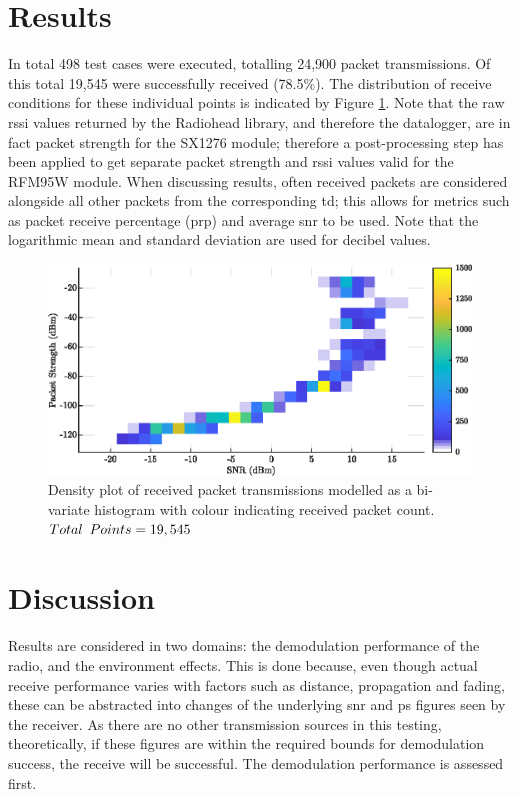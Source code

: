 \section{Results}
In total 498 test cases were executed, totalling 24,900 packet transmissions. Of this total 19,545 were successfully received (78.5\%). The distribution of receive conditions for these individual points is indicated by Figure \ref{fig:density_plot}. Note that the raw \ac{rssi} values returned by the Radiohead library, and therefore the datalogger, are in fact packet strength for the SX1276 module; therefore a post-processing step has been applied to get separate packet strength and \ac{rssi} values valid for the RFM95W module. When discussing results, often received packets are considered alongside all other packets from the corresponding \ac{td}; this allows for metrics such as packet receive percentage (\ac{prp}) and average \ac{snr} to be used. Note that the logarithmic mean and standard deviation are used for decibel values.

\begin{figure}[H]
    \centering
   	\includegraphics{Figures/density_plot}
    \caption[Test data distribution plot]{
    Density plot of received packet transmissions modelled as a bi-variate histogram with colour indicating received packet count. \\$Total\enskip Points = 19,545$
    }
    \label{fig:density_plot}
\end{figure}

\section{Discussion}
Results are considered in two domains: the demodulation performance of the radio, and the environment effects. This is done because, even though actual receive performance varies with factors such as distance, propagation and fading, these can be abstracted into changes of the underlying \ac{snr} and \ac{ps} figures seen by the receiver. As there are no other transmission sources in this testing, theoretically, if these figures are within the required bounds for demodulation success, the receive will be successful. The demodulation performance is assessed first.

